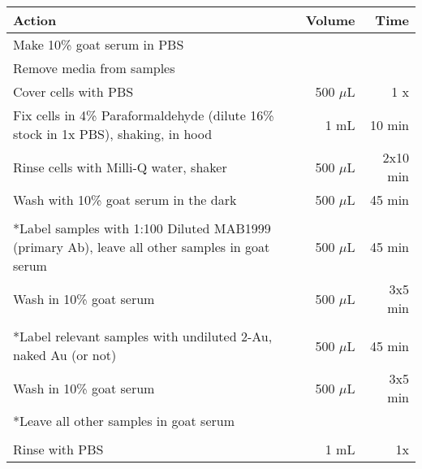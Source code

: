 \begin{table}[htbp]
\begin{minipage}{\linewidth}
\setlength{\tymax}{0.5\linewidth}
\centering
\small
\begin{tabular}{p{4in}rr} \toprule
Action&Volume&Time\\
\midrule
Make 10\% goat serum in PBS&&\\
Remove media from samples&&\\
Cover cells with PBS&500 $\mu$L&1 x\\
Fix cells in 4\% Paraformaldehyde (dilute 16\% stock in 1x PBS), shaking, in hood&1 mL&10 min\\
Rinse cells with Milli-Q water, shaker&500 $\mu$L&2x10 min\\
Wash with 10\% goat serum in the dark&500 $\mu$L&45 min\\
&&\\
*Label samples with 1:100 Diluted MAB1999 (primary Ab), leave all other samples in goat serum&500 $\mu$L&45 min\\
Wash in 10\% goat serum&500 $\mu$L&3x5 min\\
&&\\
*Label relevant samples with undiluted 2-Au, naked Au (or not)&500 $\mu$L&45 min\\
Wash in 10\% goat serum&500 $\mu$L&3x5 min\\
*Leave all other samples in goat serum&&\\
&&\\
Rinse with PBS&1 mL&1x\\

\bottomrule

\end{tabular}
\end{minipage}
\end{table}

